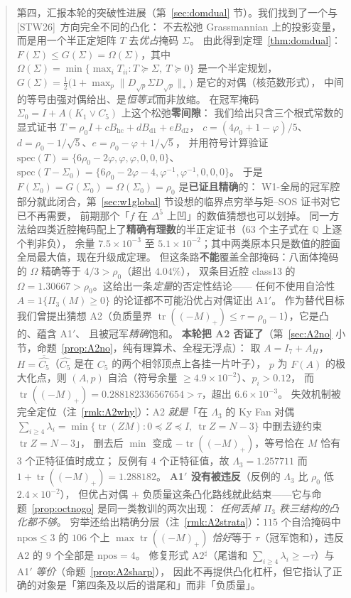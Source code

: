 \documentclass[UTF8,11pt]{ctexart}
\theoremstyle{definition}
\newcommand{\Lam}{\Lambda}
\newcommand{\tr}{\operatorname{tr}}
\newcommand{\Q}{\mathbb{Q}}
\newcommand{\STW}{\textup{[STW26]}}
\begin{document}
\begin{abstract}
第四，汇报本轮的突破性进展（第~\ref{sec:domdual} 节）。我们找到了一个与 \STW\ 方向完全不同的凸化：
不去松弛 Grassmannian 上的投影变量，而是用一个半正定矩阵 $T$ 去\emph{优占}掩码 $\Sigma$。
由此得到定理~\ref{thm:domdual}：$F(\Sigma)\le G(\Sigma)=\Omega(\Sigma)$，其中
$\Omega(\Sigma)=\min\{\max_iT_{ii}:T\succeq\Sigma,\ T\succeq0\}$ 是一个半定规划，
$G(\Sigma)=\frac12\bigl(1+\max_p\|D_{\sqrt p}\Sigma D_{\sqrt p}\|_*\bigr)$ 是它的对偶（核范数形式），
中间的等号由强对偶给出、是\emph{恒等式}而非放缩。
在冠军掩码 $\Sigma_0=I+A(K_1\vee C_5)$ 上这个松弛\textbf{零间隙}：
我们给出只含三个根式常数的显式证书 $T=\rho_0I+cB_{\mathrm{hc}}+dB_{\mathrm{d1}}+eB_{\mathrm{d2}}$，
$c=(4\rho_0+1-\varphi)/5$、$d=\rho_0-1/\sqrt5$、$e=\rho_0-\varphi+1/\sqrt5$，
并用符号计算验证 $\mathrm{spec}(T)=\{6\rho_0-2\varphi,\varphi,\varphi,0,0,0\}$、
$\mathrm{spec}(T-\Sigma_0)=\{6\rho_0-2\varphi-4,\varphi^{-1},\varphi^{-1},0,0,0\}$。
于是 $F(\Sigma_0)=G(\Sigma_0)=\Omega(\Sigma_0)=\rho_0$ 是\textbf{已证且精确}的：
W1-全局的冠军腔部分就此闭合，第~\ref{sec:w1global} 节设想的临界点穷举与矩--SOS 证书对它已不再需要，
前期那个「$f$ 在 $\Delta^5$ 上凹」的数值猜想也可以划掉。
同一方法给四类近腔掩码配上了\textbf{精确有理数}的半正定证书（$63$ 个主子式在 $\Q$ 上逐个判非负），
余量 $7.5\times10^{-3}$ 至 $5.1\times10^{-2}$；其中两类原本只是数值的腔面全局最大值，现在升级成定理。
但这条路\textbf{不能}覆盖全部掩码：八面体掩码的 $\Omega$ 精确等于 $4/3>\rho_0$（超出 $4.04\%$），
双条目近腔 class13 的 $\Omega=1.30667>\rho_0$。这给出一条\emph{定量}的否定性结论——
任何不使用自洽性 $A=1\{\Pi_3(M)\ge0\}$ 的论证都不可能沿优占对偶证出 A1$'$。
作为替代目标我们曾提出猜想 A2（负质量界 $\tr((-M)_+)\le\tau=\rho_0-1$），它是凸的、蕴含 A1$'$、
且被冠军\emph{精确}饱和。
\textbf{本轮把 A2 否证了}（第~\ref{sec:A2no} 小节，命题~\ref{prop:A2no}，纯有理算术、全程无浮点）：
取 $A=I_7+A_H$，$H=\overline{\widehat{C_5}}$（$\widehat{C_5}$ 是在 $C_5$ 的两个相邻顶点上各挂一片叶子），
$p$ 为 $F(A)$ 的极大化点，则 $(A,p)$ 自洽（符号余量 $\ge4.9\times10^{-2}$）、$p_i>0.12$，
而 $\tr((-M)_+)=0.288182336567654>\tau$，超出 $6.6\times10^{-3}$。
失效机制被完全定位（注~\ref{rmk:A2why}）：A2 \emph{就是}「在 $\Lam_3$ 的 Ky Fan 对偶
$\sum_{i\ge4}\lambda_i=\min\{\tr(ZM):0\preceq Z\preceq I,\ \tr Z=N-3\}$ 中删去迹约束 $\tr Z=N-3$」，
删去后 $\min$ 变成 $-\tr((-M)_+)$，等号恰在 $M$ 恰有 $3$ 个正特征值时成立；
反例有 $4$ 个正特征值，故 $\Lam_3=1.257711$ 而 $1+\tr((-M)_+)=1.288182$。
\textbf{A1$'$ 没有被违反}（反例的 $\Lam_3$ 比 $\rho_0$ 低 $2.4\times10^{-2}$），
但优占对偶 $+$ 负质量这条凸化路线就此结束——它与命题~\ref{prop:octnogo} 是同一类教训的两次出现：
\emph{任何丢掉 $\Pi_3$ 秩三结构的凸化都不够}。
穷举还给出精确分层（注~\ref{rmk:A2strata}）：$115$ 个自洽掩码中 $\mathrm{npos}\le3$ 的 $106$ 个上
$\max\tr((-M)_+)$ \emph{恰好}等于 $\tau$（冠军饱和），违反 A2 的 $9$ 个全部是 $\mathrm{npos}=4$。
修复形式 A2$^\sharp$（尾谱和 $\sum_{i\ge4}\lambda_i\ge-\tau$）与 A1$'$ \emph{等价}（命题~\ref{prop:A2sharp}），
因此不再提供凸化杠杆，但它指认了正确的对象是「第四条及以后的谱尾和」而非「负质量」。


\end{abstract}
\end{document}
